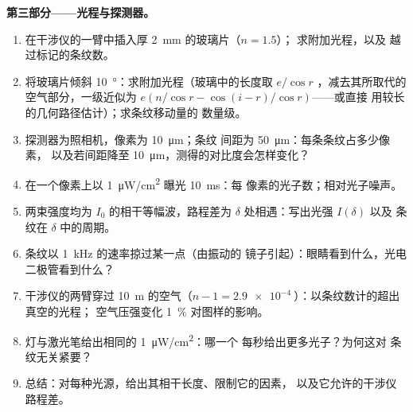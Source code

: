 \begin{problem}
\medskip
\noindent\textbf{第三部分——光程与探测器。}
\begin{enumerate}[resume]
  \item 在干涉仪的一臂中插入厚 \qty{2}{mm} 的玻璃片（$n = 1.5$）；
        求附加光程，以及
        越过标记的条纹数。
  \item 将玻璃片倾斜 \qty{10}{\degree}：求附加光程（玻璃中的长度取 $e/\cos r$
        ，减去其所取代的空气部分，一级近似为
        $e(n/\cos r - \cos(i - r)/\cos r)$——或直接
        用较长的几何路径估计）；求条纹移动量的
        数量级。
  \item 探测器为照相机，像素为 \qty{10}{\micro m}；条纹
        间距为 \qty{50}{\micro m}：每条条纹占多少像素，
        以及若间距降至
        \qty{10}{\micro m}，测得的对比度会怎样变化？
  \item 在一个像素上以 \qty{1}{\micro W/cm^2} 曝光 \qty{10}{ms}：每
        像素的光子数；相对光子噪声。
  \item 两束强度均为 $I_0$ 的相干等幅波，路程差为
        $\delta$ 处相遇：写出光强 $I(\delta)$ 以及
        条纹在 $\delta$ 中的周期。
  \item 条纹以 \qty{1}{kHz} 的速率掠过某一点（由振动的
        镜子引起）：眼睛看到什么，光电二极管看到什么？
  \item 干涉仪的两臂穿过 \qty{10}{m} 的空气（$n - 1 =
        \qty{2.9e-4}{}$）：以条纹数计的超出真空的光程；
        空气压强变化 \qty{1}{\%} 对图样的影响。
  \item 灯与激光笔给出相同的 \qty{1}{\micro W/cm^2}：哪一个
        每秒给出更多光子？为何这对
        条纹无关紧要？
  \item 总结：对每种光源，给出其相干长度、限制它的因素，
        以及它允许的干涉仪路程差。
\end{enumerate}
\end{problem}
